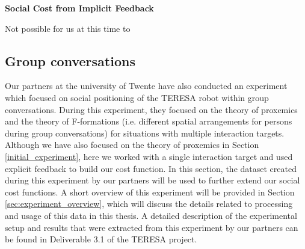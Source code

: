 \documentclass[a4paper,11pt]{report}
\begin{document}
{\bf Social Cost from Implicit Feedback}

Not possible for us at this time to 

\subsection{Group conversations}
\label{sec:group conversations}

Our partners at the university of Twente have also conducted an experiment which focused on social positioning of the TERESA robot within group conversations. 
During this experiment, they focused on the theory of proxemics and the theory of F-formations\cite{kendon1990conducting} (i.e. different spatial arrangements for persons during group conversations) for situations with multiple interaction targets.
Although we have also focused on the theory of proxemics in Section \ref{initial_experiment}, here we worked with a single interaction target and used explicit feedback to build our cost function.
In this section, the dataset created during this experiment by our partners will be used to further extend our social cost functions.
A short overview of this experiment will be provided in Section \ref{sec:experiment_overview}, which will discuss the details related to processing and usage of this data in this thesis. A detailed description of the experimental setup and results that were extracted from this experiment by our partners can be found in Deliverable 3.1\cite{teresa_d3.1} of the TERESA project.
\end{document}
